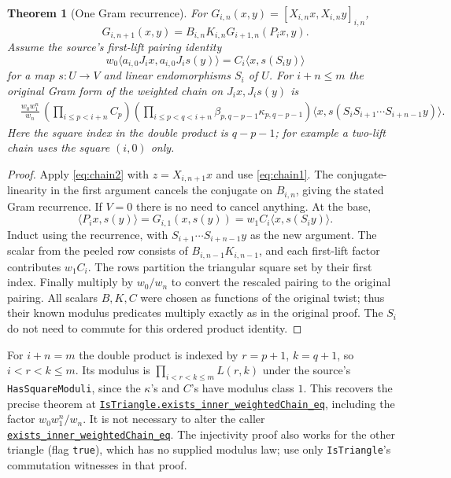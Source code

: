 \documentclass[11pt]{article}
\newtheorem{theorem}{Theorem}[section]
\newcommand{\inn}[2]{\langle #1,#2\rangle}
\newcommand{\src}[2]{\href{https://github.com/VladimirReshetnikov/ProveIt/blob/main/Analysis/GeneralizedRiemannHypothesis/Lean/grh/src/#1}{#2}}
\newcommand{\code}[1]{\texttt{#1}}
\begin{document}
\begin{theorem}[One Gram recurrence]\label{thm:gram}
For $G_{i,n}(x,y)=[X_{i,n}x,X_{i,n}y]_{i,n}$,
\[
 G_{i,n+1}(x,y)=B_{i,n}K_{i,n}G_{i+1,n}(P_i x,y).
\]
Assume the source's first-lift pairing identity
\[
 w_0\inn{a_{i,0}J_i x}{a_{i,0}J_i s(y)}=C_i\inn{x}{s(S_i y)}
\]
for a map $s:U\to V$ and linear endomorphisms $S_i$ of $U$. For $i+n\le m$ the original Gram form of the weighted chain on $J_i x,J_i s(y)$ is
\begin{align*}
 &\frac{w_0w_1^n}{w_n}\,
 \left(\prod_{i\le p<i+n} C_p\right)
 \left(\prod_{i\le p<q<i+n}\beta_{p,q-p-1}\kappa_{p,q-p-1}\right)
 \inn{x}{s(S_iS_{i+1}\cdots S_{i+n-1}y)}.
\end{align*}
Here the square index in the double product is $q-p-1$; for example a two-lift chain uses the square $(i,0)$ only.
\end{theorem}
\begin{proof}
Apply \eqref{eq:chain2} with $z=X_{i,n+1}x$ and use \eqref{eq:chain1}. The conjugate-linearity in the first argument cancels the conjugate on $B_{i,n}$, giving the stated Gram recurrence. If $V=0$ there is no need to cancel anything. At the base,
\[
 \inn{P_i x}{s(y)}=G_{i,1}(x,s(y))=w_1 C_i\inn{x}{s(S_i y)}.
\]
Induct using the recurrence, with $S_{i+1}\cdots S_{i+n-1}y$ as the new argument. The scalar from the peeled row consists of $B_{i,n-1}K_{i,n-1}$, and each first-lift factor contributes $w_1 C_i$. The rows partition the triangular square set by their first index. Finally multiply by $w_0/w_n$ to convert the rescaled pairing to the original pairing. All scalars $B,K,C$ were chosen as functions of the original twist; thus their known modulus predicates multiply exactly as in the original proof. The $S_i$ do not need to commute for this ordered product identity.
\end{proof}

For $i+n=m$ the double product is indexed by $r=p+1$, $k=q+1$, so $i<r<k\le m$. Its modulus is $\prod_{i<r<k\le m}L(r,k)$ under the source's \code{HasSquareModuli}, since the $\kappa$'s and $C$'s have modulus class $1$. This recovers the precise theorem at \src{New/Determinant/Chain/TriangleNorms.lean\#L311}{\code{IsTriangle.exists\_inner\_weightedChain\_eq}}, including the factor $w_0 w_1^n/w_n$. It is not necessary to alter the caller \src{New/Determinant/Chain/NormOfChain.lean\#L158}{\code{exists\_inner\_weightedChain\_eq}}. The injectivity proof also works for the other triangle (flag \code{true}), which has no supplied modulus law; use only \code{IsTriangle}'s commutation witnesses in that proof.
\end{document}
